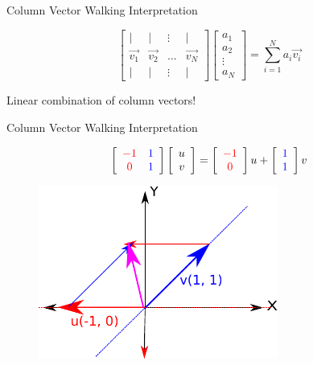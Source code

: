 \documentclass{beamer}
\begin{document}
\begin{frame}{Column Vector Walking Interpretation}

\[
\left[ \begin{array}{cccc} | & | & \vdots & |\\ \vec{v_1} & \vec{v_2} & \hdots & \vec{v_N} \\ | & | & \vdots & | \end{array}  \right] \left[ \begin{array}{c} a_1 \\ a_2 \\ \vdots \\ a_N \end{array} \right] = \sum_{i=1}^{N} a_i \vec{v_i}
\]

Linear combination of column vectors!

\end{frame}



\begin{frame}{Column Vector Walking Interpretation}

\[ \left[ \begin{array}{cc} \textcolor{red}{-1} & \textcolor{blue}{1} \\ \textcolor{red}{0} & \textcolor{blue}{1} \end{array} \right]   \left[ \begin{array}{c} u \\ v \end{array} \right]  = \left[ \begin{array}{c} \textcolor{red}{-1} \\ \textcolor{red}{0} \end{array} \right] u + \left[ \begin{array}{c} \textcolor{blue}{1} \\ \textcolor{blue}{1} \end{array} \right] v \]

\begin{figure}[t]
	\centering
    \includegraphics[width=0.7\textwidth]{ColumnVectorAdd.pdf}
\end{figure}


\end{frame}
\end{document}
